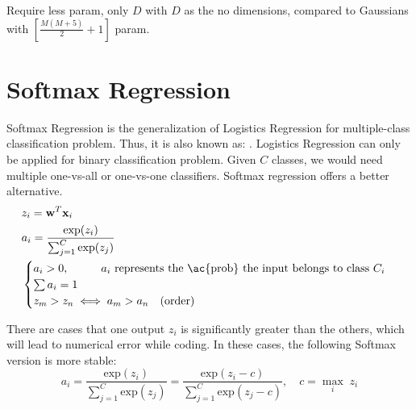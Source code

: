 \note Require less \ac{param}, only $D$ with $D$ as the \ac{no} dimensions, compared to Gaussians with $\displaystyle \left[\frac{M(M+5)}{2}+1\right]$ \ac{param}.

\section{Softmax Regression}

Softmax Regression is the generalization of Logistics Regression for multiple-class classification problem. Thus, it is also known as: . Logistics Regression can only be applied for binary classification problem. Given $C$ classes, we would need multiple one-vs-all or one-vs-one classifiers. Softmax regression offers a better alternative.
\begin{align}
	&z_i = \textbf{w}^T \textbf{x}_i\\
	&a_i = \frac{\text{exp}(z_i)}{\sum_{j=1}^{C}\text{exp}(z_j)}\\
	&\begin{cases}
		a_i > 0, \tab a_i \text{ represents the \ac{prob} the input belongs to class }C_i\\
		\sum a_i = 1 \\
		z_m > z_n \iff a_m > a_n \quad \text{(order)}
	\end{cases}
\end{align}

There are cases that one output $z_i$ is significantly greater than the others, which will lead to numerical error while coding. In these cases, the following Softmax version is more stable:
\begin{equation}
	a_i = \frac{\text{exp}(z_i)}{\sum_{j=1}^{C}\text{exp}(z_j)} = \frac{\text{exp}(z_i - c)}{\sum_{j=1}^{C}\text{exp}(z_j - c)},\quad c = \underset{i}{\max}\;z_i
\end{equation}

